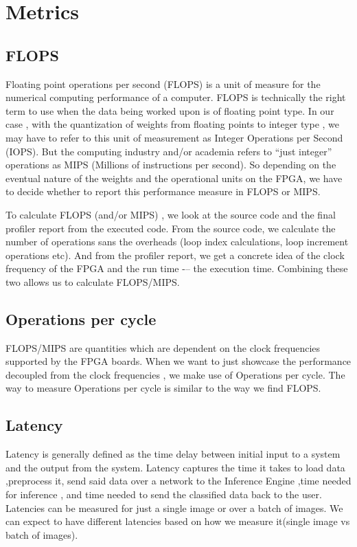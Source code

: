 \documentclass[titlepage]{report}
\begin{document}
\pagebreak





\chapter{Metrics}

\section{FLOPS}
Floating point operations per second (FLOPS) is a  unit of measure for the numerical computing performance of a computer. FLOPS is technically the right term to use when the data being worked upon is of floating point type.
In our case , with the quantization of weights from floating points  to integer type , we may have to refer to this unit of measurement as Integer Operations per Second (IOPS).
But the computing  industry and/or academia refers to ``just integer'' operations as MIPS (Millions of instructions per second). So depending on the eventual nature of the weights and the operational units on the FPGA,
we have to decide whether to report this performance measure in FLOPS or MIPS.  

To calculate FLOPS (and/or MIPS) , we look at the source code and the final profiler report from the executed code.
From the source code, we calculate the number of operations sans the overheads (loop index calculations, loop increment operations etc). And from the profiler report, we get a concrete idea of the clock frequency of the FPGA and the run time -– the execution time. Combining these two allows us to calculate  FLOPS/MIPS.


\section{Operations per cycle}
FLOPS/MIPS are quantities which are dependent on the clock frequencies supported by the FPGA boards.
When we want to just showcase the performance decoupled from the clock frequencies , we make use of Operations per cycle.
The way to measure Operations per cycle is similar to the way we find FLOPS. 

\section{Latency}
Latency is generally defined as the time delay between initial input to a system and the output from the system.
Latency captures the time it takes to load  data ,preprocess it, send said data over a network to the Inference Engine ,time needed for inference , and time needed to send the classified data back to the user.
Latencies can be measured for just a single image or over a batch of images. We can expect to have different latencies based on how we measure it(single image vs batch of images).
\end{document}
